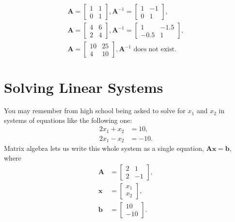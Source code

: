 \documentclass[
  12pt,
  oneside,openany]{book}
\begin{document}
\[
\begin{gathered}
\mathbf{A} = \begin{bmatrix}
1 & 1 \\
0 & 1
\end{bmatrix},
\mathbf{A}^{-1} = \begin{bmatrix}
1 & -1 \\
0 & 1
\end{bmatrix}, \\
\mathbf{A} = \begin{bmatrix}
4 & 6 \\
2 & 4
\end{bmatrix},
\mathbf{A}^{-1} = \begin{bmatrix}
1 & -1.5 \\
-0.5 & 1
\end{bmatrix}, \\
\mathbf{A} = \begin{bmatrix}
10 & 25 \\
4 & 10
\end{bmatrix},
\text{$\mathbf{A}^{-1}$ does not exist}.
\end{gathered}
\]

\hypertarget{solving-linear-systems}{%
\section{Solving Linear Systems}\label{solving-linear-systems}}

You may remember from high school being asked to solve for \(x_1\) and \(x_2\) in systems of equations like the following one:
\[
\begin{aligned}
2 x_1 + x_2 &= 10, \\
2 x_1 - x_2 &= -10.
\end{aligned}
\]
Matrix algebra lets us write this whole system as a single equation, \(\mathbf{A} \mathbf{x} = \mathbf{b}\), where
\[
\begin{aligned}
\mathbf{A} &= \begin{bmatrix}
2 & 1 \\
2 & -1
\end{bmatrix}, \\
\mathbf{x} &= \begin{bmatrix} x_1 \\ x_2 \end{bmatrix}, \\
\mathbf{b} &= \begin{bmatrix} 10 \\ -10 \end{bmatrix}.
\end{aligned}
\]
\end{document}
